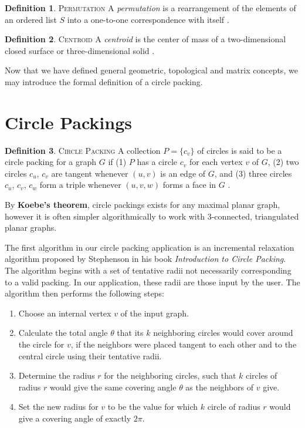 \documentclass[11pt]{article}
\theoremstyle{definition}
\newtheorem{definition}{Definition}[section]
\begin{document}
	\theoremstyle{definition}
	\begin{definition}{\textsc{Permutation}}
		 A \emph{permutation} is a rearrangement of the elements of an ordered list $S$ into a one-to-one correspondence with itself \cite{mathworld:Permutation}.
	\end{definition}
	
	\theoremstyle{definition}
	\begin{definition}{\textsc{Centroid}}
		A \emph{centroid} is the center of mass of a two-dimensional closed surface or three-dimensional solid \cite{mathworld:Centroid}.
	\end{definition}
	Now that we have defined general geometric, topological and matrix concepts, we may introduce the formal definition of a circle packing.

\section{Circle Packings}
	\theoremstyle{definition}
	\begin{definition}{\textsc{Circle Packing}}
		A collection $P = \{c_v\}$ of circles is said to be a circle packing for a graph $G$ if 
		(1) $P$ has a circle $c_v$ for each vertex $v$ of $G$, 
		(2) two circles $c_u$, $c_v$ are tangent whenever $(u,v)$ is an edge of $G$, and 
		(3) three circles $c_u$, $c_v$, $c_w$ form a triple whenever $(u,v,w)$ forms a face in $G$ \cite{stephenson05introduction}.
	\end{definition}

	By \textbf{Koebe's theorem}, circle packings exists for any maximal planar graph, however it is often simpler algorithmically to work with 3-connected, triangulated planar graphs.

	The first algorithm in our circle packing application is an incremental relaxation algorithm proposed by Stephenson in his book \emph{Introduction to Circle Packing}. 
	The algorithm begins with a set of tentative radii not necessarily corresponding to a valid packing. In our application, these radii are those input by the user. 
	The algorithm then performs the following steps:
	
	\begin{enumerate}
		\item Choose an internal vertex $v$ of the input graph.
		\item Calculate the total angle $\theta$ that its $k$ neighboring circles would cover around the circle for $v$, if the neighbors were placed tangent to each other and to the central circle using their tentative radii.
		\item Determine the radius $r$ for the neighboring circles, such that $k$ circles of radius $r$ would give the same covering angle $\theta$ as the neighbors of $v$ give.
		\item Set the new radius for $v$ to be the value for which $k$ circle of radius $r$ would give a covering angle of exactly $2\pi$.
	\end{enumerate}
	
\end{document}

